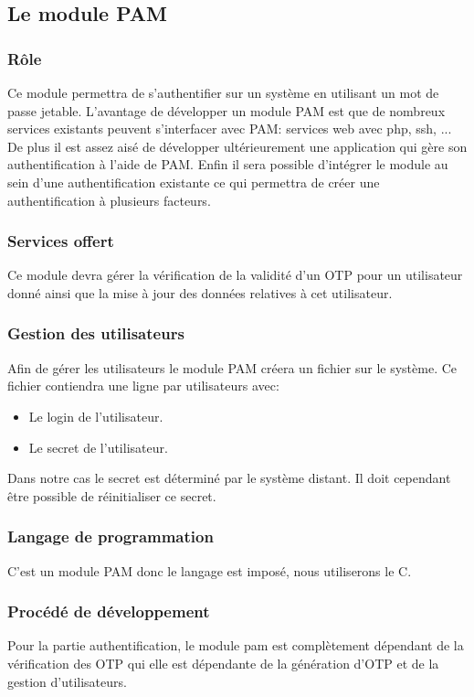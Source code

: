 \documentclass{"../../res/univ-projet"}
\begin{document}
  
\subsection{Le module PAM}
\subsubsection{Rôle}
  Ce module permettra de s'authentifier sur un système en utilisant un mot de passe
  jetable. L'avantage de développer un module PAM est que de nombreux services existants
  peuvent s'interfacer avec PAM: services web avec php, ssh, ... De plus il est assez
  aisé de développer ultérieurement une application qui gère son authentification à l'aide de PAM.
  Enfin il sera possible d'intégrer le module au sein d'une authentification existante ce qui permettra
  de créer une authentification à plusieurs facteurs.
  
  
\subsubsection{Services offert}
  Ce module devra gérer la vérification de la validité d'un OTP pour un utilisateur donné ainsi que la
  mise à jour des données relatives à cet utilisateur.
  
\subsubsection{Gestion des utilisateurs}
  Afin de gérer les utilisateurs le module PAM créera un fichier sur le système.
  Ce fichier contiendra une ligne par utilisateurs avec:
  \begin{itemize}
   \item Le login de l'utilisateur.
   \item Le secret de l'utilisateur.
  \end{itemize}
  
  Dans notre cas le secret est déterminé par le système distant. Il doit
  cependant être possible de réinitialiser ce secret. 
  
\subsubsection{Langage de programmation}
  C'est un module PAM donc le langage est imposé, nous utiliserons le C.
  
\subsubsection{Procédé de développement}
  Pour la partie authentification, le module pam est complètement
  dépendant de la vérification des OTP qui elle est dépendante de la 
  génération d'OTP et de la gestion d'utilisateurs.
\end{document}
